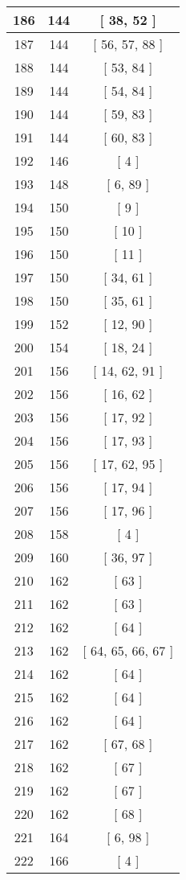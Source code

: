 \begin{center}
\begin{longtable}[H]{|| c c c ||}
186 & 144 & [ 38, 52 ]
\\\hline
187 & 144 & [ 56, 57, 88 ]
\\\hline
188 & 144 & [ 53, 84 ]
\\\hline
189 & 144 & [ 54, 84 ]
\\\hline
190 & 144 & [ 59, 83 ]
\\\hline
191 & 144 & [ 60, 83 ]
\\\hline
192 & 146 & [ 4 ]
\\\hline
193 & 148 & [ 6, 89 ]
\\\hline
194 & 150 & [ 9 ]
\\\hline
195 & 150 & [ 10 ]
\\\hline
196 & 150 & [ 11 ]
\\\hline
197 & 150 & [ 34, 61 ]
\\\hline
198 & 150 & [ 35, 61 ]
\\\hline
199 & 152 & [ 12, 90 ]
\\\hline
200 & 154 & [ 18, 24 ]
\\\hline
201 & 156 & [ 14, 62, 91 ]
\\\hline
202 & 156 & [ 16, 62 ]
\\\hline
203 & 156 & [ 17, 92 ]
\\\hline
204 & 156 & [ 17, 93 ]
\\\hline
205 & 156 & [ 17, 62, 95 ]
\\\hline
206 & 156 & [ 17, 94 ]
\\\hline
207 & 156 & [ 17, 96 ]
\\\hline
208 & 158 & [ 4 ]
\\\hline
209 & 160 & [ 36, 97 ]
\\\hline
210 & 162 & [ 63 ]
\\\hline
211 & 162 & [ 63 ]
\\\hline
212 & 162 & [ 64 ]
\\\hline
213 & 162 & [ 64, 65, 66, 67 ]
\\\hline
214 & 162 & [ 64 ]
\\\hline
215 & 162 & [ 64 ]
\\\hline
216 & 162 & [ 64 ]
\\\hline
217 & 162 & [ 67, 68 ]
\\\hline
218 & 162 & [ 67 ]
\\\hline
219 & 162 & [ 67 ]
\\\hline
220 & 162 & [ 68 ]
\\\hline
221 & 164 & [ 6, 98 ]
\\\hline
222 & 166 & [ 4 ]
\\\hline

\end{longtable}
\end{center}
